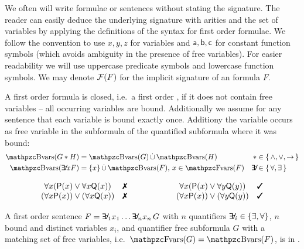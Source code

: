 We often will write formulae or sentences
without stating the signature.
The reader can easily deduce the underlying  signature with arities
and the set of variables by applying the definitions of the syntax for first order formulae.
We follow the convention to use $x,y,z$ for variables
and $\mathsf{a},\mathsf{b},\mathsf{c}$ for constant function symbols
(which avoids ambiguity in the presence of free variables).
For easier readability we will use uppercase predicate symbols and lowercase function symbols.
We may denote $\mathcal{F}(F)$ for the implicit signature of an formula $F$.

\begin{definition}\label{def:fof:closed}\label{def:fof:sentence}
	A first order formula is closed, i.e.~a first order ,
	if it does not contain free variables -- all occurring variables are bound.
	Additionally we assume for any sentence
	that each variable is bound exactly once.
	Additiony the variable occurs as free variable
	in the subformula of the quantified subformula
	where it was bound:
	\begin{align*}
	\bvar(G * H) &= \bvar(G)\disjointunion\bvar(H)
	 &*& \in\{\,\land,\lor,\limp\,\}
	\\
	\bvar(\quantify x F) &= \{x\}\disjointunion\bvar(F)\text{, } x\in\fvar(F)
	&\quantify& \in\{\, \forall, \exists\,\}
\end{align*}
\end{definition}

\begin{example}
	\[
	\begin{array}{clccl}
		\forall x ({\mP(x) \lor \forall x {\mQ(x)}}) &
		\text{\xmark}
		&\qquad\qquad
		&
		\forall x ({\mP(x) \lor \forall y {\mQ(y)}}) &
		\text{\cmark}
		\\
		(\forall x {\mP(x)}) \lor (\forall x {\mQ(x)}) &
		\text{\xmark}
		&&
		(\forall x {\mP(x)}) \lor (\forall y {\mQ(y)}) &
		\text{\cmark}
	\end{array}
	\]

\end{example}

\begin{definition}[\PNF]
	A first order sentence $F = \quantify_1 x_1 \ldots \quantify_n x_n\, G$
	with $n$ quantifiers $\quantify_i \in \{\exists,\forall\}$,
	$n$ bound and distinct variables $x_i$,
	and quantifier free subformula $G$ with
	a matching set of free variables, i.e.~$\fvar(G) = \bvar(F)$,
	is in .
\end{definition}


